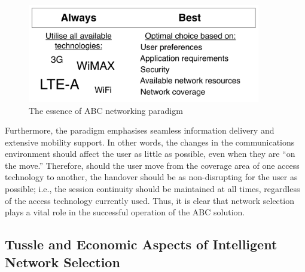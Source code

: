 \begin{figure}[ht]
    \centering
    \includegraphics[width=4in]{Intelligent/Figures/abc}
    \caption{The essence of ABC networking paradigm}
    \label{fig:abc_intelligent}
\end{figure}

Furthermore, the paradigm emphasises seamless information delivery and extensive mobility support. In other words, the changes in the communications environment should affect the user as little as possible, even when they are ``on the move.'' Therefore, should the user move from the coverage area of one access technology to another, the handover should be as non-disrupting for the user as possible; i.e., the session continuity should be maintained at all times, regardless of the access technology currently used. Thus, it is clear that network selection plays a vital role in the successful operation of the ABC solution.

\subsection{Tussle and Economic Aspects of Intelligent Network Selection} %
\label{sub:tussle_and_economic_aspects_of_intelligent_network_selection_intelligent}


